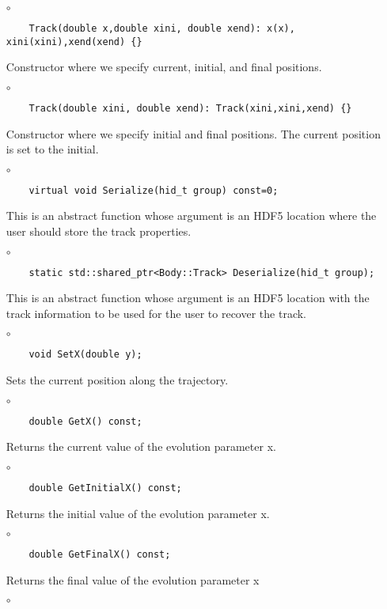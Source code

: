 \begin{itemize}
\item[$\circ$]  
  \begin{lstlisting}
    Track(double x,double xini, double xend): x(x), xini(xini),xend(xend) {}
  \end{lstlisting}
  Constructor where we specify current, initial, and final positions. 
\item[$\circ$]  
  \begin{lstlisting}
    Track(double xini, double xend): Track(xini,xini,xend) {}
  \end{lstlisting}
  Constructor where we specify initial and final positions. The
  current position is set to the initial. 
  \item[$\circ$]  
  \begin{lstlisting}
    virtual void Serialize(hid_t group) const=0;
  \end{lstlisting}
  This is an abstract function whose argument is an HDF5 location
  where the user should store the track properties.
  \item[$\circ$]  
  \begin{lstlisting}
    static std::shared_ptr<Body::Track> Deserialize(hid_t group);
  \end{lstlisting}
  This is an abstract function whose argument is an HDF5 location
  with the track information to be used for the user to recover the track.
\item[$\circ$]  
  \begin{lstlisting}
    void SetX(double y);
  \end{lstlisting}
  Sets the current position along the trajectory.  
\item[$\circ$]  
  \begin{lstlisting}
    double GetX() const;
  \end{lstlisting}
  Returns the current value of the evolution parameter {\ttf x}.
\item[$\circ$]  
  \begin{lstlisting}
    double GetInitialX() const;
  \end{lstlisting}    
  Returns the initial value of the evolution parameter {\ttf x}.
\item[$\circ$]  
  \begin{lstlisting}
    double GetFinalX() const;
  \end{lstlisting}          
  Returns the final value of the evolution parameter {\ttf x}
\item[$\circ$]  
  \begin{lstlisting}

\end{lstlisting}
\end{itemize}
